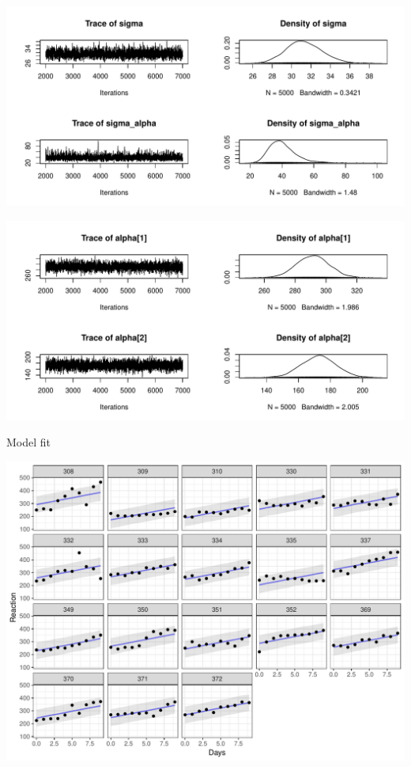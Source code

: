 \documentclass[11pt,ignorenonframetext,]{beamer}
\begin{document}
\begin{frame}{}

\begin{center}\includegraphics{Lec5_files/figure-beamer/unnamed-chunk-15-1} \end{center}

\end{frame}

\begin{frame}{}

\begin{center}\includegraphics{Lec5_files/figure-beamer/unnamed-chunk-16-1} \end{center}

\end{frame}

\begin{frame}{Model fit}

\includegraphics{Lec5_files/figure-beamer/unnamed-chunk-18-1.pdf}

\end{frame}
\end{document}
